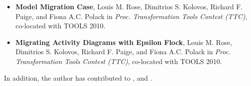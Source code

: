 {\begin{itemize}
	\item \textbf{Model Migration Case}, Louis M. Rose, Dimitrios S. Kolovos, Richard F. Paige, and Fiona A.C. Polack in \emph{Proc. Transformation Tools Contest (TTC)}, co-located with TOOLS 2010.
	
	\item \textbf{Migrating Activity Diagrams with Epsilon Flock}, Louis M. Rose, Dimitrios S. Kolovos, Richard F. Paige, and Fiona A.C. Polack in \emph{Proc. Transformation Tools Contest (TTC)}, co-located with TOOLS 2010.	
\end{itemize}

In addition, the author has contributed to \cite{kolovos07ewl}, \cite{kolovos07ewlgmf} and \cite{paige08fptc}.
}
